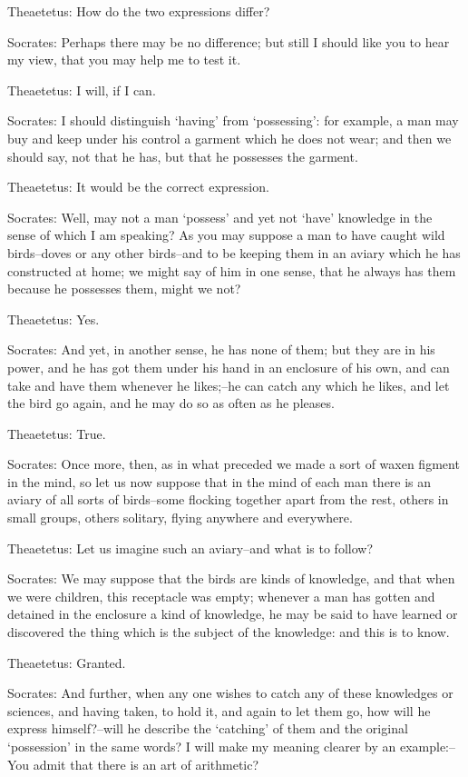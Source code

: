 Theaetetus: How do the two expressions differ?

Socrates: Perhaps there may be no difference; but still I should like
you to hear my view, that you may help me to test it.

Theaetetus: I will, if I can.

Socrates: I should distinguish `having' from `possessing': for example,
a man may buy and keep under his control a garment which he does not
wear; and then we should say, not that he has, but that he possesses the
garment.

Theaetetus: It would be the correct expression.

Socrates: Well, may not a man `possess' and yet not `have' knowledge
in the sense of which I am speaking? As you may suppose a man to have
caught wild birds--doves or any other birds--and to be keeping them in
an aviary which he has constructed at home; we might say of him in one
sense, that he always has them because he possesses them, might we not?

Theaetetus: Yes.

Socrates: And yet, in another sense, he has none of them; but they are
in his power, and he has got them under his hand in an enclosure of his
own, and can take and have them whenever he likes;--he can catch any
which he likes, and let the bird go again, and he may do so as often as
he pleases.

Theaetetus: True.

Socrates: Once more, then, as in what preceded we made a sort of waxen
figment in the mind, so let us now suppose that in the mind of each man
there is an aviary of all sorts of birds--some flocking together apart
from the rest, others in small groups, others solitary, flying anywhere
and everywhere.

Theaetetus: Let us imagine such an aviary--and what is to follow?

Socrates: We may suppose that the birds are kinds of knowledge, and that
when we were children, this receptacle was empty; whenever a man has
gotten and detained in the enclosure a kind of knowledge, he may be
said to have learned or discovered the thing which is the subject of the
knowledge: and this is to know.

Theaetetus: Granted.

Socrates: And further, when any one wishes to catch any of these
knowledges or sciences, and having taken, to hold it, and again to let
them go, how will he express himself?--will he describe the `catching'
of them and the original `possession' in the same words? I will make
my meaning clearer by an example:--You admit that there is an art of
arithmetic?

